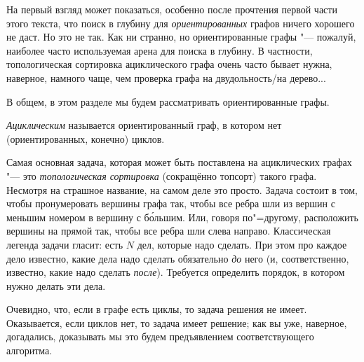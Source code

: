 
На первый взгляд может показаться, особенно после прочтения первой части этого текста, что поиск в 
глубину для \textit{ориентированных} графов ничего хорошего не даст. Но это не так. 
Как ни странно, но ориентированные графы "--- пожалуй, наиболее часто используемая арена для поиска 
в глубину. В частности, топологическая сортировка ациклического графа очень часто бывает нужна, 
наверное, намного чаще, чем проверка графа на двудольность/на дерево...

В общем, в этом разделе мы будем рассматривать ориентированные графы.

\textit{Ациклическим} называется ориентированный граф, в котором нет (ориентированных, конечно) 
циклов.  

Самая основная задача, которая может быть поставлена на ациклических графах "--- это 
\textit{топологическая сортировка} (сокращённо топсорт) такого графа. Несмотря на страшное 
название, на самом деле это 
просто. Задача состоит в том, чтобы пронумеровать вершины графа так, чтобы все ребра шли из вершин 
с меньшим номером в вершину с б\'{о}льшим. Или, говоря по"=другому, расположить вершины на прямой 
так, чтобы все ребра шли слева направо. Классическая легенда задачи гласит: есть $N$ дел, которые 
надо сделать. При этом про каждое дело известно, какие дела надо сделать обязательно \textit{до} 
него (и, соответственно, известно, какие надо сделать \textit{после}). Требуется определить 
порядок, в котором нужно делать эти дела.

Очевидно, что, если в графе есть циклы, то задача решения не имеет. Оказывается, если циклов нет, 
то задача имеет решение; как вы уже, наверное, догадались, доказывать мы это будем предъявлением 
соответствующего алгоритма.

